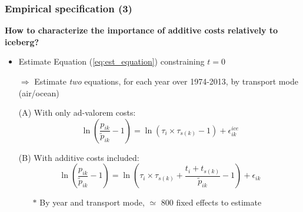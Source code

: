 \documentclass[10 pt,Helvetica, french]{beamer}
\begin{document}
\begin{frame}
\frametitle{Empirical specification (3)}
\textbf{How to characterize the importance of additive costs relatively to iceberg?} \vspace{0.1cm}
\begin{itemize}
\item Estimate Equation (\ref{eq:est_equation}) constraining $t=0$ \vspace{0.1cm}
\item[$\Rightarrow$] Estimate \textit{two} equations, for each year over 1974-2013, by transport mode (air/ocean)\vspace{0.1cm}
\item[(A)] With only ad-valorem costs:
\footnotesize
\begin{equation}
\ln\left(\frac{p_{ik}}{\widetilde{p}_{ik}}-1 \right)= \ln \left(\tau_{i} \times \tau_{s(k)}-1 \right) + \epsilon^{ice}_{ik} \label{eq:model_nlI}
\end{equation}
\normalsize
\item[(B)] With additive costs included:
\footnotesize
\begin{equation}
\ln\left(\frac{p_{ik}}{\widetilde{p}_{ik}}-1 \right)= \ln \left(\tau_{i} \times \tau_{s(k)}+\frac{t_{i} + t_{s(k)}}{\widetilde{p}_{ik}}-1 \right) + \epsilon_{ik} \label{eq:est_equation}
\end{equation}
\normalsize
\begin{itemize}
\item[$\ast$] By year and transport mode, $\simeq$ 800 fixed effects to estimate   \vspace{0.1cm}
\end{itemize}
\end{itemize}
\end{frame}
\end{document}

